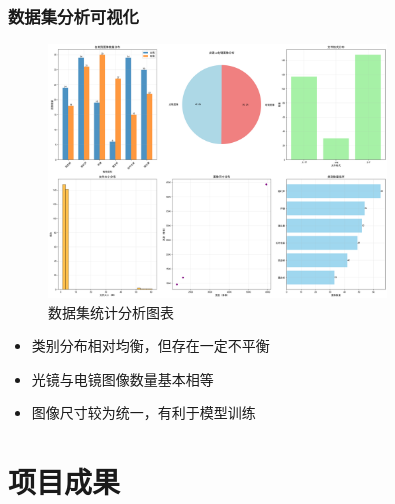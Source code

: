\documentclass[12pt]{beamer}
\begin{document}
\begin{frame}
\frametitle{数据集分析可视化}
\begin{figure}
\centering
\includegraphics[width=0.8\textwidth]{dataset_analysis.png}
\caption{数据集统计分析图表}
\end{figure}

\begin{itemize}
    \item 类别分布相对均衡，但存在一定不平衡
    \item 光镜与电镜图像数量基本相等
    \item 图像尺寸较为统一，有利于模型训练
\end{itemize}
\end{frame}

\section{项目成果}
\end{document}
